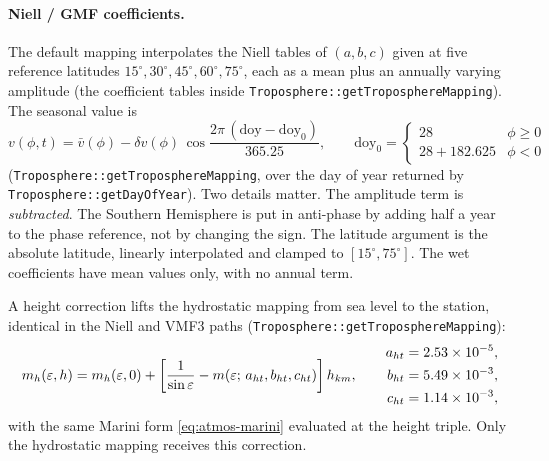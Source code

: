 \documentclass[main.tex]{subfiles}
\begin{document}
\paragraph{Niell / GMF coefficients.}
The default mapping interpolates the Niell tables \cite{niell1996global}
of $(a,b,c)$ given at five reference latitudes $15^\circ, 30^\circ,
45^\circ, 60^\circ, 75^\circ$, each as a mean plus an annually varying
amplitude (the coefficient tables inside
\texttt{Troposphere::getTroposphereMapping}).  The seasonal value
is
\begin{equation}
v(\phi,t) = \bar v(\phi)
   - \delta v(\phi)\,
     \cos\!\frac{2\pi\,(\mathrm{doy} - \mathrm{doy}_0)}{365.25},
\qquad \mathrm{doy}_0 =
\begin{cases} 28 & \phi \ge 0 \\ 28 + 182.625 & \phi < 0 \end{cases}
\label{eq:atmos-niell-season}
\end{equation}
(\texttt{Troposphere::getTroposphereMapping}, over the day of year returned
by \texttt{Troposphere::getDayOfYear}).  Two details matter.  The
amplitude term is \emph{subtracted}.  The Southern Hemisphere is put in
anti-phase by adding half a year to the phase reference, not by changing
the sign.  The latitude argument is the absolute latitude, linearly
interpolated and clamped to $[15^\circ,75^\circ]$.  The wet coefficients
have mean values only, with no annual term.

A height correction lifts the hydrostatic mapping from sea level to the
station, identical in the Niell and VMF3 paths
(\texttt{Troposphere::getTroposphereMapping}):
\begin{equation}
m_{h}(\varepsilon,h) = m_{h}(\varepsilon,0)
  + \left[\frac{1}{\sin\varepsilon} - m(\varepsilon;\,a_{ht},b_{ht},c_{ht})\right] h_{km},
\qquad
\begin{aligned}
a_{ht} &= 2.53\times10^{-5},\\
b_{ht} &= 5.49\times10^{-3},\\
c_{ht} &= 1.14\times10^{-3},
\end{aligned}
\label{eq:atmos-height-corr}
\end{equation}
with the same Marini form \eqref{eq:atmos-marini} evaluated at the height
triple.  Only the hydrostatic mapping receives this correction.
\end{document}
